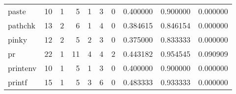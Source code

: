 \begin{longtable}{lrrrrrrrrr}
paste     &                                       10 &                                                  1 &                                                  5 &                                                  1 &                                                  3 &                                                  0 &                                           0.400000 &                               0.900000 &                             0.000000 \\
pathchk   &                                       13 &                                                  2 &                                                  6 &                                                  1 &                                                  4 &                                                  0 &                                           0.384615 &                               0.846154 &                             0.000000 \\
pinky     &                                       12 &                                                  2 &                                                  5 &                                                  2 &                                                  3 &                                                  0 &                                           0.375000 &                               0.833333 &                             0.000000 \\
pr        &                                       22 &                                                  1 &                                                 11 &                                                  4 &                                                  4 &                                                  2 &                                           0.443182 &                               0.954545 &                             0.090909 \\
printenv  &                                       10 &                                                  1 &                                                  5 &                                                  1 &                                                  3 &                                                  0 &                                           0.400000 &                               0.900000 &                             0.000000 \\
printf    &                                       15 &                                                  1 &                                                  5 &                                                  3 &                                                  6 &                                                  0 &                                           0.483333 &                               0.933333 &                             0.000000 \\

\end{longtable}
